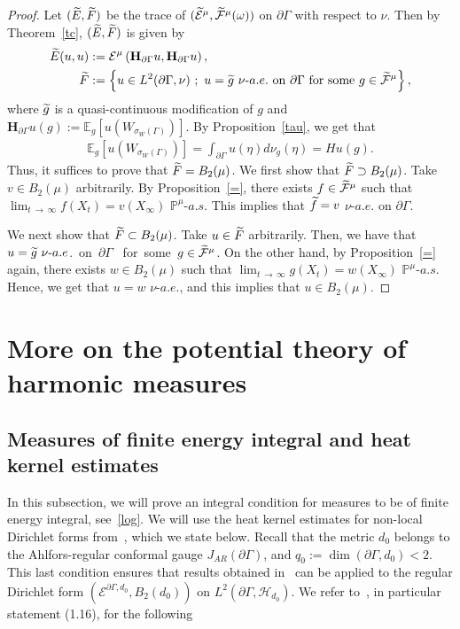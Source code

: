 \documentclass[AHL,Unicode,longabstracts,published]{cedram}
\newcommand{\ce}{\mathcal{E}}
\newcommand{\cf}{\mathcal{F}}
\newcommand{\ch}{\mathcal{H}}
\newcommand{\bp}{\mathbb{P}}
\newcommand{\be}{\mathbb{E}}
\newcommand{\bfH}{\mathbf{H}}
\let\oldtilde\tilde
\renewcommand*{\tilde}[1]{\mathchoice{\widetilde{#1}}{\widetilde{#1}}{\oldtilde{#1}}{\oldtilde{#1}}}
\begin{document}
\begin{proof}
Let $(\tilde{E},\tilde{F})$ be the trace of $(\tilde\ce^{\mu}, \tilde\cf^{\mu}(\omega))$ on $\partial\Gamma$ with respect to $\nu$. Then by Theorem~\ref{tc}, $(\tilde{E},\tilde{F})$ is given by
\begin{align*}
\tilde{E}(u,u)&:=\ce^{\mu}\left(\bfH_{\partial\Gamma}u,\bfH_{\partial\Gamma}u\right),\\
\tilde{F}&:=\left\{u\in L^2(\partial\Gamma,\nu)\ ;\ u=\tilde{g}\ \nu\mathchar`-a.e.\ \text{on}\ \partial\Gamma
\ \text{for\ some}\ g\in\tilde\cf^{\mu}\right\},
\end{align*}
where $\tilde{g}$ is a quasi-continuous modification of $g$ and $\bfH_{\partial\Gamma}u(g):=\be_g[u(W_{\sigma_W(\Gamma)})]$. By Proposition~\ref{tau}, we get that
\begin{align*}
\be_g\left[u\left(W_{\sigma_W(\Gamma)}\right)\right]=\int_{\partial\Gamma}u(\eta)d\nu_g(\eta)=Hu(g).
\end{align*}
Thus, it suffices to prove that $\tilde{F}=B_2(\mu)$. We first show that $\tilde{F}\supset B_2(\mu)$. Take $v\in B_2(\mu)$ arbitrarily. By Proposition~\ref{=}, there exists $f\in\tilde\cf^{\mu}$ such that $\lim_{t\,\to\,\infty}f(X_t)=v(X_{\infty})$ ${\bp}^{\mu}$-$a.s.$ This implies that $\tilde{f}=v$ $\nu$-$a.e.$ on $\partial\Gamma$.

We next show that $\tilde{F}\subset B_2(\mu)$. Take $u\in\tilde{F}$ arbitrarily. Then, we have that $u=\tilde{g}\ \nu\mathchar`-a.e$.\ on\ $\partial\Gamma$
\ for\ some\ $g\in\tilde\cf^{\mu}$. On the other hand, by Proposition~\ref{=} again, there exists $w\in B_2(\mu)$ such that $\lim_{t\,\to\,\infty}g(X_t)=w(X_{\infty})$ ${\bp}^{\mu}$-$a.s.$ Hence, we get that $u=w$ $\nu$-$a.e.$, and this implies that $u\in B_2(\mu)$.
\end{proof}

\section{More on the potential theory of harmonic measures}\label{sect9}
\subsection{Measures of finite energy integral and heat kernel estimates}

In this subsection, we will prove an integral condition for measures to be of finite energy integral, see~\eqref{log}. We will use the heat kernel estimates for non-local Dirichlet forms from~\cite{CK,CKW,GHH}, which we state below. Recall that the metric $d_0$ belongs to the Ahlfors-regular conformal gauge $J_{AR}(\partial\Gamma)$, and $q_0:=\dim(\partial\Gamma,d_0)<2$. This last condition ensures that results obtained in~\cite{GHH} can be applied to the regular Dirichlet form $(\ce^{\partial\Gamma,d_0},B_2(d_0))$ on $L^2(\partial\Gamma,\ch_{d_0})$. We refer to~\cite{GHH}, in particular statement (1.16), for the following
\end{document}
